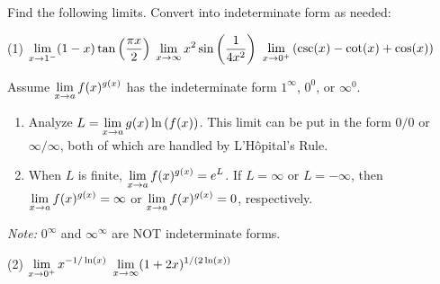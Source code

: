 \documentclass[../mathNotesPreamble]{subfiles}
\begin{document}

\begin{ex*}
  Find the following limits. Convert into indeterminate form as needed:
\end{ex*}
\begin{tasks}[after-item-skip=\stretch{1}, label=~](1)
  \task $\ds\lim_{x\to 1\inv[]}(1-x)\tan\parens{\frac{\pi x}{2}}$
  \task $\ds\lim_{x\to \infty} x^2\sin\parens{\frac{1}{4x^2}}$
  \task $\ds\lim_{x\to 0^+} \parens{\csc(x)-\cot(x)+\cos(x)}$
\end{tasks}
\pagebreak

\begin{thmBox*}
  Assume $\ds\lim_{x\to a} f(x)^{g(x)}$ has the indeterminate form $1^\infty$, $0^0$, or $\infty^0$.
  \begin{enumerate}
    \item Analyze $L=\ds\lim_{x\to a} g(x)\ln\parens{f(x)}$. This limit can be put in the form $0/0$ or $\infty/\infty$, both of which are handled by L'H\^opital's Rule.
    \item When $L$ is finite, $\ds\lim_{x\to a} f(x)^{g(x)}= e^L$. If $L=\infty$ or $L=-\infty$, then \newline$\ds\lim_{x\to a} f(x)^{g(x)}=\infty$ or $\ds\lim_{x\to a} f(x)^{g(x)}=0$, respectively.
  \end{enumerate}
  
  \textit{Note:} $0^\infty$ and $\infty^\infty$ are NOT indeterminate forms.
\end{thmBox*}

\begin{tasks}[after-item-skip=\stretch{1}, label=~](2)
  \task $\ds\lim_{x\to 0^+} x^{-1/\ln(x)}$
  \task $\ds\lim_{x\to \infty} (1+2x)^{1/(2\ln(x))}$
\end{tasks}
\pagebreak
\end{document}
